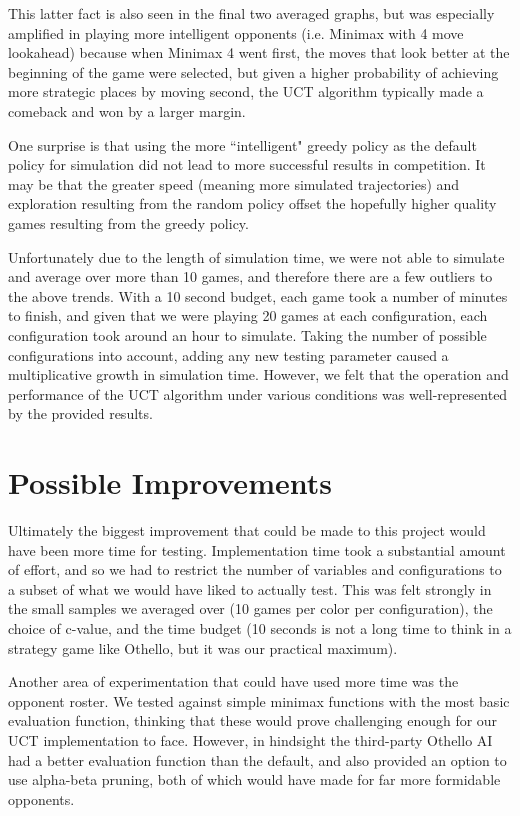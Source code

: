 \documentclass[12pt,letterpaper]{article}
\begin{document}
This latter fact is also seen in the final two averaged graphs, but was especially amplified in playing more intelligent opponents (i.e. Minimax with 4 move lookahead) because when Minimax 4 went first, the moves that look better at the beginning of the game were selected, but given a higher probability of achieving more strategic places by moving second, the UCT algorithm typically made a comeback and won by a larger margin.

One surprise is that using the more ``intelligent" greedy policy as the default policy for simulation did not lead to more successful results in competition. It may be that the greater speed (meaning more simulated trajectories) and exploration resulting from the random policy offset the hopefully higher quality games resulting from the greedy policy.

Unfortunately due to the length of simulation time, we were not able to simulate and average over more than 10 games, and therefore there are a few outliers to the above trends. With a 10 second budget, each game took a number of minutes to finish, and given that we were playing 20 games at each configuration, each configuration took around an hour to simulate. Taking the number of possible configurations into account, adding any new testing parameter caused a multiplicative growth in simulation time. However, we felt that the operation and performance of the UCT algorithm under various conditions was well-represented by the provided results.

\section{Possible Improvements}
\label{impr}
Ultimately the biggest improvement that could be made to this project would have been more time for testing. Implementation time took a substantial amount of effort, and so we had to restrict the number of variables and configurations to a subset of what we would have liked to actually test. This was felt strongly in the small samples we averaged over (10 games per color per configuration), the choice of c-value, and the time budget (10 seconds is not a long time to think in a strategy game like Othello, but it was our practical maximum).

Another area of experimentation that could have used more time was the opponent roster. We tested against simple minimax functions with the most basic evaluation function, thinking that these would prove challenging enough for our UCT implementation to face. However, in hindsight the third-party Othello AI had a better evaluation function than the default, and also provided an option to use alpha-beta pruning, both of which would have made for far more formidable opponents.
\end{document}

